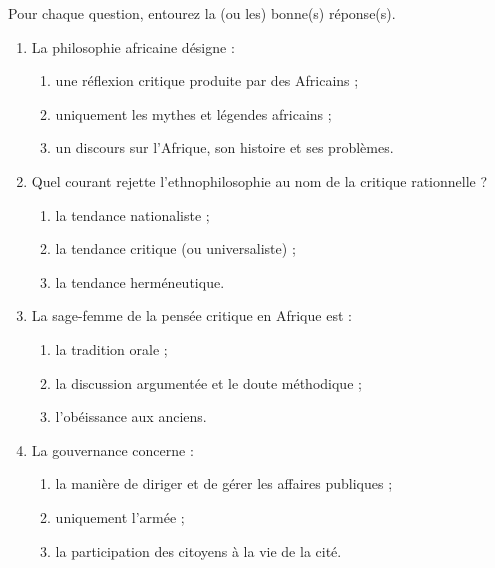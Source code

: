 \documentclass[11pt]{article}
\begin{document}
\begin{exercice}[QCM]
Pour chaque question, entourez la (ou les) bonne(s) réponse(s).
\begin{enumerate}
\item La philosophie africaine désigne :
\begin{enumerate}
\item[a)] une réflexion critique produite par des Africains ;
\item[b)] uniquement les mythes et légendes africains ;
\item[c)] un discours sur l'Afrique, son histoire et ses problèmes.
\end{enumerate}
\item Quel courant rejette l'ethnophilosophie au nom de la critique rationnelle ?
\begin{enumerate}
\item[a)] la tendance nationaliste ;
\item[b)] la tendance critique (ou universaliste) ;
\item[c)] la tendance herméneutique.
\end{enumerate}
\item La sage-femme de la pensée critique en Afrique est :
\begin{enumerate}
\item[a)] la tradition orale ;
\item[b)] la discussion argumentée et le doute méthodique ;
\item[c)] l'obéissance aux anciens.
\end{enumerate}
\item La gouvernance concerne :
\begin{enumerate}
\item[a)] la manière de diriger et de gérer les affaires publiques ;
\item[b)] uniquement l'armée ;
\item[c)] la participation des citoyens à la vie de la cité.
\end{enumerate}
\end{enumerate}
\end{exercice}
\end{document}
